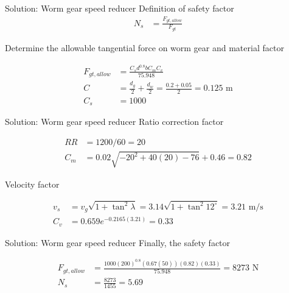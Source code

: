 \documentclass[10pt, svgnames]{beamer}
\begin{document}
\begin{frame}[label={sec:org82aef01}]{Solution: Worm gear speed reducer}
Definition of safety factor
\begin{align*}
    N_{s} &= \frac{F_{gt,allow}}{F_{gt}}
\end{align*}

Determine the allowable tangential force on worm gear and material factor

\begin{align*}
    F_{gt,allow} &= \frac{C_{s}d^{0.8}bC_{m}C_{v}}{75.948} \\
    C &= \frac{d_{g}}{2} + \frac{d_{w}}{2} = \frac{0.2 + 0.05}{2} = 0.125 \text{ m} \\
    C_{s} &= 1000
\end{align*}
\end{frame}

\begin{frame}[label={sec:orgb638aa8}]{Solution: Worm gear speed reducer}
Ratio correction factor

\begin{align*}
    RR &= 1200/60 = 20 \\
    C_{m}&= 0.02 \sqrt{-20^{2} + 40(20) - 76} + 0.46 = 0.82
\end{align*}

Velocity factor

\begin{align*}
    v_{s} &= v_{g}\sqrt{1+\tan^{2} \lambda} = 3.14 \sqrt{1 + \tan^{2} 12^{\circ}} = 3.21 \text{ m/s} \\
    C_{v} &= 0.659e^{-0.2165(3.21)} = 0.33
\end{align*}
\end{frame}

\begin{frame}[label={sec:org1fb22c4}]{Solution: Worm gear speed reducer}
Finally, the safety factor

\begin{align*}
    F_{gt,allow} &= \frac{1000(200)^{0.8}(0.67(50))(0.82)(0.33)}{75.948} = 8273 \text{ N} \\
    N_{s} &= \frac{8273}{1455} = 5.69
\end{align*}
\end{frame}
\end{document}
